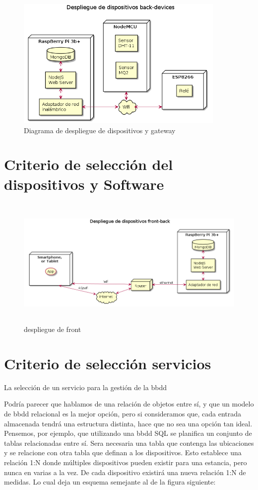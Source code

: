 \begin{figure}[hbt!]
\centering
\includegraphics[height=2.5in]{figures/diagrams/physical-devices/back-devices.png}
\caption[Diagrama de despliegue de back-end]{Diagrama de despliegue de dispositivos y gateway\footnotemark}
\end{figure}

\section{Criterio de selección del dispositivos y Software}
\label{makereference4.3}

\begin{figure}[hbt!]
\centering
\includegraphics[height=2.5in]{figures/diagrams/physical-devices/front-back.png}
\caption[Despligue de front]{despliegue de front\footnotemark}
\end{figure}

\section{Criterio de selección servicios}
\label{makereference4.4}
La selección de un servicio para la gestión de la \gls{bbdd}


Podría parecer que hablamos de una relación de objetos entre sí, y que un modelo de \gls{bbdd} relacional es la mejor opción, pero si consideramos que, cada entrada almacenada tendrá una estructura distinta, hace que no sea una opción tan ideal. Pensemos, por ejemplo, que utilizando una \gls{bbdd} SQL se planifica un conjunto de tablas relacionadas entre sí. Sera necesaria una tabla que contenga las ubicaciones y se relacione con otra tabla que definan a los dispositivos. Esto establece una relación 1:N donde múltiples dispositivos pueden existir para una estancia, pero nunca en varias a la vez. De cada dispositivo existirá una nueva relación 1:N de medidas. Lo cual deja un esquema semejante al de la figura siguiente:


